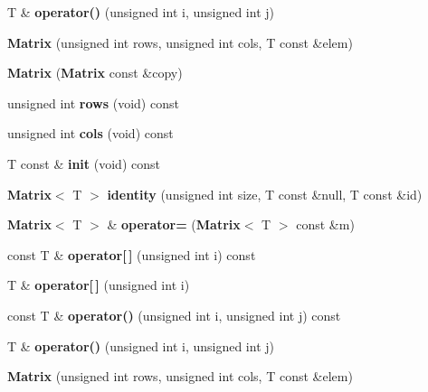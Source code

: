 \begin{DoxyCompactItemize}
\item 
T \& {\bfseries operator()} (unsigned int i, unsigned int j)\label{class_g_a_n_n_1_1_matrix_ac3f7f2d7467ba5bc95fca1890be74a38}

\item 
{\bfseries Matrix} (unsigned int rows, unsigned int cols, T const \&elem)\label{class_g_a_n_n_1_1_matrix_a370ad3ace72e48cf5ac3d2fd672dd679}

\item 
{\bfseries Matrix} ({\bf Matrix} const \&copy)\label{class_g_a_n_n_1_1_matrix_a9af1de05104cf864d0089575e772b74b}

\item 
unsigned int {\bfseries rows} (void) const \label{class_g_a_n_n_1_1_matrix_a14c1233ee25f1cd5823676277e1956f2}

\item 
unsigned int {\bfseries cols} (void) const \label{class_g_a_n_n_1_1_matrix_adc449f757249fe5bfc5bdae3c809d7e7}

\item 
T const \& {\bfseries init} (void) const \label{class_g_a_n_n_1_1_matrix_a5369d9c2dc7ae6a0941f1aba36f15259}

\item 
{\bf Matrix}$<$ T $>$ {\bfseries identity} (unsigned int size, T const \&null, T const \&id)\label{class_g_a_n_n_1_1_matrix_ae61ef07a101463ad49ab8f9f7dd4f2fe}

\item 
{\bf Matrix}$<$ T $>$ \& {\bfseries operator=} ({\bf Matrix}$<$ T $>$ const \&m)\label{class_g_a_n_n_1_1_matrix_a0aa93d1a66567637deb98c943f936fd4}

\item 
const T \& {\bfseries operator[$\,$]} (unsigned int i) const \label{class_g_a_n_n_1_1_matrix_add9f200cb6a2e53709090621e3a1150a}

\item 
T \& {\bfseries operator[$\,$]} (unsigned int i)\label{class_g_a_n_n_1_1_matrix_a700ad2c1e9ab4fd76fe1cb18092a80f1}

\item 
const T \& {\bfseries operator()} (unsigned int i, unsigned int j) const \label{class_g_a_n_n_1_1_matrix_aa3bef5292a718f45e094926602ff65ca}

\item 
T \& {\bfseries operator()} (unsigned int i, unsigned int j)\label{class_g_a_n_n_1_1_matrix_ac3f7f2d7467ba5bc95fca1890be74a38}

\item 
{\bfseries Matrix} (unsigned int rows, unsigned int cols, T const \&elem)\label{class_g_a_n_n_1_1_matrix_a370ad3ace72e48cf5ac3d2fd672dd679}


\end{DoxyCompactItemize}
